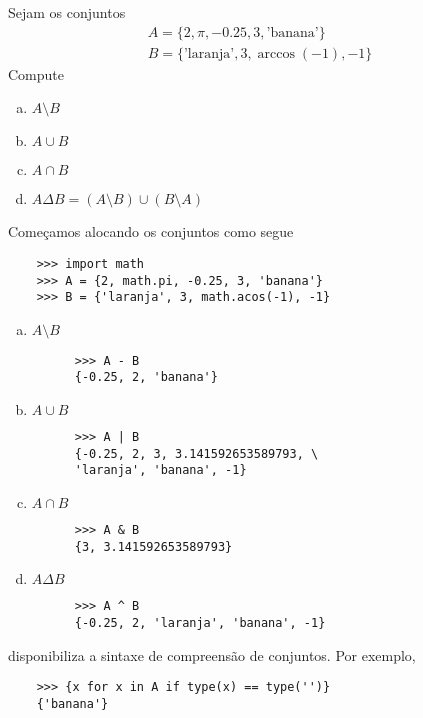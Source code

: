 \documentclass[12pt]{article}
\begin{document}
\begin{ex}
  Sejam os conjuntos
  \begin{gather}
    A = \{2, \pi, -0.25, 3, \text{'banana'}\}\\
    B = \{\text{'laranja'}, 3, \operatorname{arc cos}(-1), -1\}
  \end{gather}
  Compute
  \begin{enumerate}[a)]
  \item $A\setminus B$
  \item $A\cup B$
  \item $A\cap B$
  \item $A\Delta B = (A\setminus B) \cup (B\setminus A)$
  \end{enumerate}

   Começamos alocando os conjuntos como segue
  \begin{lstlisting}
    >>> import math
    >>> A = {2, math.pi, -0.25, 3, 'banana'}
    >>> B = {'laranja', 3, math.acos(-1), -1}
  \end{lstlisting}
  
  \begin{enumerate}[a)]
  \item $A\setminus B$
    \begin{lstlisting}
      >>> A - B
      {-0.25, 2, 'banana'}
    \end{lstlisting}
  \item $A\cup B$
    \begin{lstlisting}
      >>> A | B
      {-0.25, 2, 3, 3.141592653589793, \
      'laranja', 'banana', -1}
    \end{lstlisting}
  \item $A\cap B$
    \begin{lstlisting}
      >>> A & B
      {3, 3.141592653589793}
    \end{lstlisting}
  \item $A\Delta B$
    \begin{lstlisting}
      >>> A ^ B
      {-0.25, 2, 'laranja', 'banana', -1}
    \end{lstlisting}
  \end{enumerate}
\end{ex}

\begin{obs}
  {\python} disponibiliza a sintaxe de compreensão de conjuntos. Por exemplo,
  \begin{lstlisting}
    >>> {x for x in A if type(x) == type('')}
    {'banana'}
  \end{lstlisting}
\end{obs}
\end{document}

